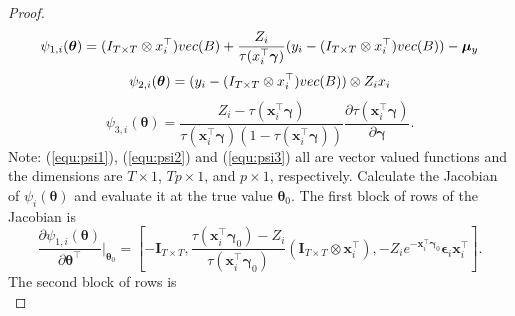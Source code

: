 \documentclass[10pt,a4paper]{amsart}
\newcommand{\IdenMat}{\textbf{I}}
\newcommand{\LogCoe}{\boldsymbol{\gamma}}
\newcommand{\ObsCov}{\textbf{x}_i}
\newcommand{\ObsRes}{\textbf{y}_i}
\newcommand{\SumOverN}{\sum_{i=1}^n}
\newcommand{\vect}{\emph{vec}}
\begin{document}
\begin{proof}
            \begin{equation}\label{equ:psi1}
                \psi_{1,i}(\boldsymbol{\theta}) = (\IdenMat_{T \times T} \otimes \ObsCov^{\top})\vect(\textbf{B}) + \frac{Z_i}{\tau(\ObsCov^{\top}\LogCoe)}(\textbf{y}_i - (\IdenMat_{T \times T} \otimes \ObsCov^{\top})\vect(\textbf{B})) - \boldsymbol{\mu}_{y}
            \end{equation}    
            \begin{equation}\label{equ:psi2}
                \psi_{2,i}(\boldsymbol{\theta}) = (\ObsRes - (\IdenMat_{T \times T} \otimes \ObsCov^{\top})\vect(\textbf{B})) \otimes Z_i \ObsCov
            \end{equation}    
            \begin{equation}\label{equ:psi3}
                \psi_{3,i}(\boldsymbol{\theta}) = \frac{Z_i - \tau(\ObsCov^{\top} \LogCoe)}{\tau(\ObsCov^{\top} \LogCoe)(1-\tau(\ObsCov^{\top} \LogCoe))} \frac{\partial \tau(\ObsCov^{\top} \LogCoe)}{ \partial \LogCoe}.
            \end{equation}
        Note: (\ref{equ:psi1}), (\ref{equ:psi2}) and (\ref{equ:psi3}) all are vector valued functions and the dimensions are $T \times 1$, $Tp \times 1$, and $p \times 1$, respectively.
        Calculate the Jacobian of $\psi_i(\boldsymbol{\theta})$ and evaluate it at the true value $\boldsymbol{\theta}_0$.
        The first block of rows of the Jacobian is
            \begin{equation*}
                \frac{\partial \psi_{1,i}(\boldsymbol{\theta})}{ \partial \boldsymbol{\theta}^{\top} } \biggr\rvert_{\boldsymbol{\theta}_0}  
                = \left[ - \IdenMat_{T \times T}, \frac{\tau(\ObsCov^{\top} \LogCoe_0)- Z_i}{\tau(\ObsCov^{\top} \LogCoe_0 )} (\IdenMat_{T \times T} \otimes \ObsCov^{\top}), -Z_i e^{-\ObsCov^{\top} \LogCoe_0} \boldsymbol{\epsilon}_i \ObsCov^{\top} \right].
            \end{equation*}        
        The second block of rows is
            \begin{equation*}

\end{equation*}
\end{proof}
\end{document}
